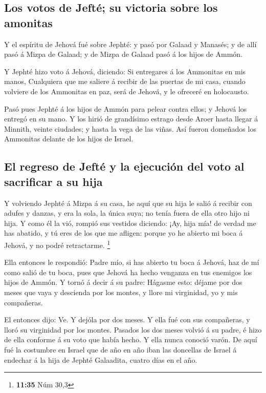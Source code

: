 \hypertarget{los-votos-de-jeftuxe9-su-victoria-sobre-los-amonitas}{%
\subsection{Los votos de Jefté; su victoria sobre los
amonitas}\label{los-votos-de-jeftuxe9-su-victoria-sobre-los-amonitas}}

 Y el espíritu de Jehová fué sobre Jephté: y pasó por
Galaad y Manasés; y de allí pasó á Mizpa de Galaad; y de Mizpa de Galaad
pasó á los hijos de Ammón.

 Y Jephté hizo voto á Jehová, diciendo: Si entregares á
los Ammonitas en mis manos,  Cualquiera que me saliere á
recibir de las puertas de mi casa, cuando volviere de los Ammonitas en
paz, será de Jehová, y le ofreceré en holocausto.

 Pasó pues Jephté á los hijos de Ammón para pelear contra
ellos; y Jehová los entregó en su mano.  Y los hirió de
grandísimo estrago desde Aroer hasta llegar á Minnith, veinte ciudades;
y hasta la vega de las viñas. Así fueron domeñados los Ammonitas delante
de los hijos de Israel.

\hypertarget{el-regreso-de-jeftuxe9-y-la-ejecuciuxf3n-del-voto-al-sacrificar-a-su-hija}{%
\subsection{El regreso de Jefté y la ejecución del voto al sacrificar a
su
hija}\label{el-regreso-de-jeftuxe9-y-la-ejecuciuxf3n-del-voto-al-sacrificar-a-su-hija}}

 Y volviendo Jephté á Mizpa á su casa, he aquí que su
hija le salió á recibir con adufes y danzas, y era la sola, la única
suya; no tenía fuera de ella otro hijo ni hija.  Y como
él la vió, rompió sus vestidos diciendo: ¡Ay, hija mía! de verdad me has
abatido, y tú eres de los que me afligen: porque yo he abierto mi boca á
Jehová, y no podré retractarme. \footnote{\textbf{11:35} Núm 30,3}

 Ella entonces le respondió: Padre mío, si has abierto tu
boca á Jehová, haz de mí como salió de tu boca, pues que Jehová ha hecho
venganza en tus enemigos los hijos de Ammón.  Y tornó á
decir á su padre: Hágasme esto: déjame por dos meses que vaya y
descienda por los montes, y llore mi virginidad, yo y mis compañeras.

 El entonces dijo: Ve. Y dejóla por dos meses. Y ella fué
con sus compañeras, y lloró su virginidad por los montes.
 Pasados los dos meses volvió á su padre, é hizo de ella
conforme á su voto que había hecho. Y ella nunca conoció varón.
 De aquí fué la costumbre en Israel que de año en año
iban las doncellas de Israel á endechar á la hija de Jephté Galaadita,
cuatro días en el año.

